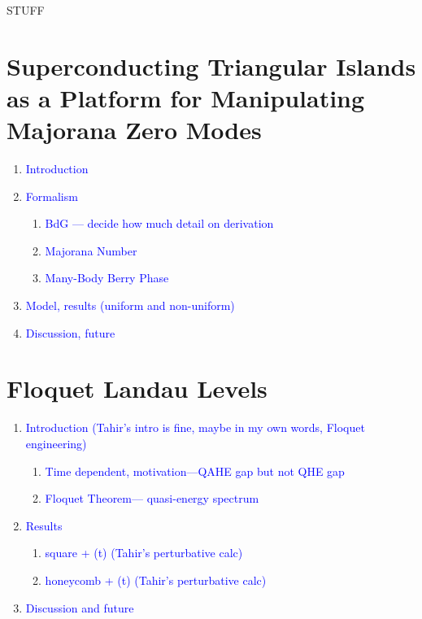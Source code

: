 \documentclass[12pt,doctor]{thesis}
\newcommand{\Blue}[1]{\textcolor{blue}{#1}}
\renewcommand{\vec}[1]{\mathbf{#1}}
\begin{document}
STUFF
\chapter{Superconducting Triangular Islands as a Platform for Manipulating Majorana Zero Modes}

\begin{enumerate}
  \item \Blue{Introduction}
  \item \Blue{Formalism}
  \begin{enumerate}[i]
    \item \Blue{BdG --- decide how much detail on derivation}
    \item \Blue{Majorana Number}
    \item \Blue{Many-Body Berry Phase}
  \end{enumerate}
  \item \Blue{Model, results (uniform and non-uniform)}
  \item \Blue{Discussion, future}
\end{enumerate}




\chapter{Floquet Landau Levels}

\begin{enumerate}
  \item \Blue{Introduction (Tahir's intro is fine, maybe in my own words, Floquet engineering)}
  \begin{enumerate}[i]
    \item \Blue{Time dependent, motivation---QAHE gap but not QHE gap}
    \item \Blue{Floquet Theorem--- quasi-energy spectrum}
  \end{enumerate}
  \item \Blue{Results}
  \begin{enumerate}[i]
    \item \Blue{square + \vec{A}(t) (Tahir's perturbative calc)}
    \item \Blue{honeycomb + \vec{A}(t) (Tahir's perturbative calc)}
  \end{enumerate}
  \item \Blue{Discussion and future}
\end{enumerate}
\end{document}
